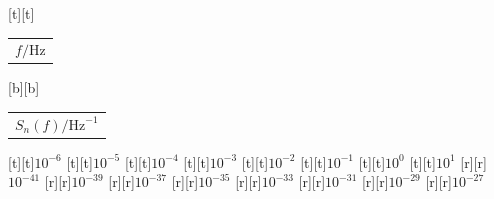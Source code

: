 %    
%
%
\begin{psfrags}%
\psfragscanon%
%
[t][t]{\color[rgb]{0,0,0}\setlength{\tabcolsep}{0pt}\begin{tabular}{c}$f/\mathrm{Hz}$\end{tabular}}%
[b][b]{\color[rgb]{0,0,0}\setlength{\tabcolsep}{0pt}\begin{tabular}{c}$S_n(f)/\mathrm{Hz}^{-1}$\end{tabular}}%
%
[t][t]{$10^{-6}$}%
[t][t]{$10^{-5}$}%
[t][t]{$10^{-4}$}%
[t][t]{$10^{-3}$}%
[t][t]{$10^{-2}$}%
[t][t]{$10^{-1}$}%
[t][t]{$10^{0}$}%
[t][t]{$10^{1}$}%
%
[r][r]{$10^{-41}$}%
[r][r]{$10^{-39}$}%
[r][r]{$10^{-37}$}%
[r][r]{$10^{-35}$}%
[r][r]{$10^{-33}$}%
[r][r]{$10^{-31}$}%
[r][r]{$10^{-29}$}%
[r][r]{$10^{-27}$}%
%
%
\end{psfrags}%
%
